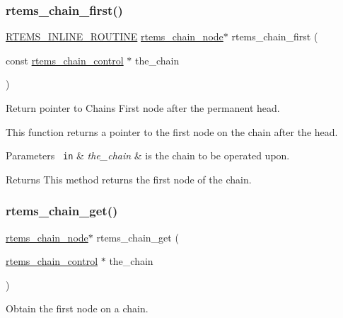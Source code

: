 \subsubsection{\texorpdfstring{rtems\_chain\_first()}{rtems\_chain\_first()}}
{\footnotesize\ttfamily \mbox{\hyperlink{group__RTEMSScoreBaseDefs_gac216239df231d5dbd15e3520b0b9313f}{R\+T\+E\+M\+S\+\_\+\+I\+N\+L\+I\+N\+E\+\_\+\+R\+O\+U\+T\+I\+NE}} \mbox{\hyperlink{structChain__Node__struct}{rtems\+\_\+chain\+\_\+node}}$\ast$ rtems\+\_\+chain\+\_\+first (\begin{DoxyParamCaption}\item[{const \mbox{\hyperlink{unionChain__Control}{rtems\+\_\+chain\+\_\+control}} $\ast$}]{the\+\_\+chain }\end{DoxyParamCaption})}



Return pointer to Chain\textquotesingle{}s First node after the permanent head. 

This function returns a pointer to the first node on the chain after the head.


\begin{DoxyParams}[1]{Parameters}
\mbox{\texttt{ in}}  & {\em the\+\_\+chain} & is the chain to be operated upon.\\
\hline
\end{DoxyParams}
\begin{DoxyReturn}{Returns}
This method returns the first node of the chain. 
\end{DoxyReturn}
\mbox{\label{group__ClassicChains_ga46e031f6b5fddb8e9aedae6e82496bde}} 
\subsubsection{\texorpdfstring{rtems\_chain\_get()}{rtems\_chain\_get()}}
{\footnotesize\ttfamily \mbox{\hyperlink{structChain__Node__struct}{rtems\+\_\+chain\+\_\+node}}$\ast$ rtems\+\_\+chain\+\_\+get (\begin{DoxyParamCaption}\item[{\mbox{\hyperlink{unionChain__Control}{rtems\+\_\+chain\+\_\+control}} $\ast$}]{the\+\_\+chain }\end{DoxyParamCaption})}



Obtain the first node on a chain. 

